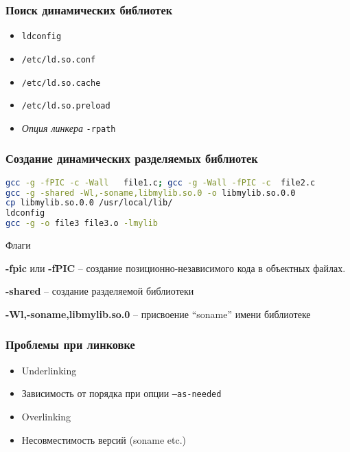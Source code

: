 \begin{frame}[fragile]
  \frametitle{Поиск динамических библиотек}
  \begin{itemize}
	\item {\tt ldconfig}
	\item {\tt /etc/ld.so.conf}
	\item {\tt /etc/ld.so.cache}
	\item {\tt /etc/ld.so.preload}
	\item {\it Опция линкера} {\tt -rpath}
  \end{itemize}
\end{frame}


\begin{frame}[fragile]
  \frametitle{Создание динамических разделяемых библиотек}
\begin{lstlisting}[language=sh]
gcc -g -fPIC -c -Wall   file1.c; gcc -g -Wall -fPIC -c  file2.c
gcc -g -shared -Wl,-soname,libmylib.so.0 -o libmylib.so.0.0 
cp libmylib.so.0.0 /usr/local/lib/
ldconfig 
gcc -g -o file3 file3.o -lmylib
\end{lstlisting}

	\begin{block}{Флаги}
	
		{\bf -fpic} или {\bf -fPIC} -- создание позиционно-независимого кода в объектных файлах.

		{\bf -shared} -- создание разделяемой библиотеки

		{\bf -Wl,-soname,libmylib.so.0} -- присвоение ``soname'' имени библиотеке

	\end{block}

\end{frame}

\begin{frame}
 \frametitle{Проблемы при линковке}
 \begin{itemize}
   \item Underlinking
   \item Зависимость от порядка при опции {\tt --as-needed} 
   \item Overlinking
   \item Несовместимость версий (soname etc.)
 \end{itemize}
\end{frame}

